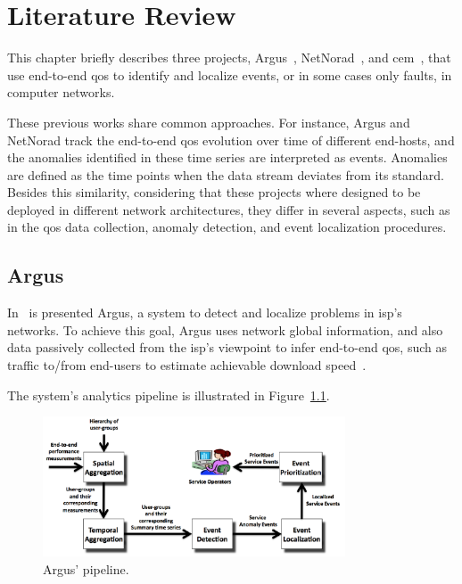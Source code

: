 \chapter{Literature Review}
\label{chap:literature_review}

This chapter briefly describes three projects,
Argus~\cite{argus_end_to_end_service_anomaly_detection_and_localization_from_an_isps_point_of_view},
NetNorad~\cite{netnorad},
and \gls*{cem}~\cite{crowdsourcing_service_level_network_event_monitoring},
that use end-to-end \gls*{qos} to identify and localize events, or in some cases
only faults, in computer networks.

These previous works share common approaches.
For instance, Argus and
NetNorad track the end-to-end \gls*{qos} evolution over time of different
end-hosts,
and the anomalies identified in these time series are interpreted as events.
Anomalies are defined as the time points when the data stream deviates from its
standard.
Besides this similarity, considering that these projects where designed to be
deployed in different network architectures, they differ in several aspects,
such as in the \gls*{qos} data collection, anomaly detection, and event
localization procedures.

\section{Argus}

In~\cite{argus_end_to_end_service_anomaly_detection_and_localization_from_an_isps_point_of_view}
is presented Argus, a system to
detect and localize problems in \gls*{isp}'s networks. To achieve this goal,
Argus uses network global information, and also data passively collected
from the \gls*{isp}'s viewpoint to infer
end-to-end \gls*{qos}, such as traffic to/from end-users to estimate achievable
download
speed~\cite{speed_testing_without_speed_tests_estimating_achievable_download_speed_from_passive_measurements}.

The system's analytics pipeline is illustrated in
Figure~\ref{fig:argus_pipeline}.

\begin{figure}[H]
    \centering
    \includegraphics[width=0.8\textwidth]{./figures/literature_review/argus_pipeline.png}
    \caption{Argus' pipeline.~\cite{argus_end_to_end_service_anomaly_detection_and_localization_from_an_isps_point_of_view}}
\label{fig:argus_pipeline}
\end{figure}%

